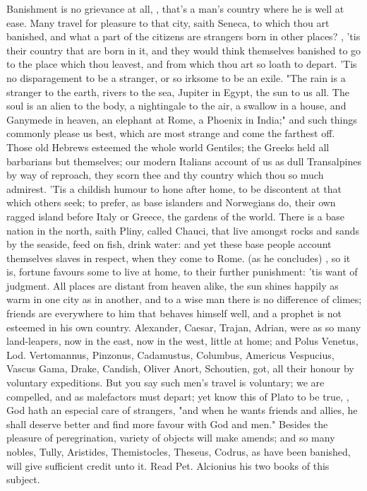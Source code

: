 {Banishment is no grievance at all, , that's a man's country where he is well at ease. Many travel for pleasure to that city, saith Seneca, to which thou art banished, and what a part of the citizens are strangers born in other places? , 'tis their country that are born in it, and they would think themselves banished to go to the place which thou leavest, and from which thou art so loath to depart. 'Tis no disparagement to be a stranger, or so irksome to be an exile. "The rain is a stranger to the earth, rivers to the sea, Jupiter in Egypt, the sun to us all. The soul is an alien to the body, a nightingale to the air, a swallow in a house, and Ganymede in heaven, an elephant at Rome, a Phoenix in India;" and such things commonly please us best, which are most strange and come the farthest off. Those old Hebrews esteemed the whole world Gentiles; the Greeks held all barbarians but themselves; our modern Italians account of us as dull Transalpines by way of reproach, they scorn thee and thy country which thou so much admirest. 'Tis a childish humour to hone after home, to be discontent at that which others seek; to prefer, as base islanders and Norwegians do, their own ragged island before Italy or Greece, the gardens of the world. There is a base nation in the north, saith Pliny, called Chauci, that live amongst rocks and sands by the seaside, feed on fish, drink water: and yet these base people account themselves slaves in respect, when they come to Rome.  (as he concludes) , so it is, fortune favours some to live at home, to their further punishment: 'tis want of judgment. All places are distant from heaven alike, the sun shines happily as warm in one city as in another, and to a wise man there is no difference of climes; friends are everywhere to him that behaves himself well, and a prophet is not esteemed in his own country. Alexander, Caesar, Trajan, Adrian, were as so many land-leapers, now in the east, now in the west, little at home; and Polus Venetus, Lod. Vertomannus, Pinzonus, Cadamustus, Columbus, Americus Vespucius, Vascus Gama, Drake, Candish, Oliver Anort, Schoutien, got, all their honour by voluntary expeditions. But you say such men's travel is voluntary; we are compelled, and as malefactors must depart; yet know this of Plato to be true, , God hath an especial care of strangers, "and when he wants friends and allies, he shall deserve better and find more favour with God and men." Besides the pleasure of peregrination, variety of objects will make amends; and so many nobles, Tully, Aristides, Themistocles, Theseus, Codrus, \etc{} as have been banished, will give sufficient credit unto it. Read Pet. Alcionius his two books of this subject.

}
